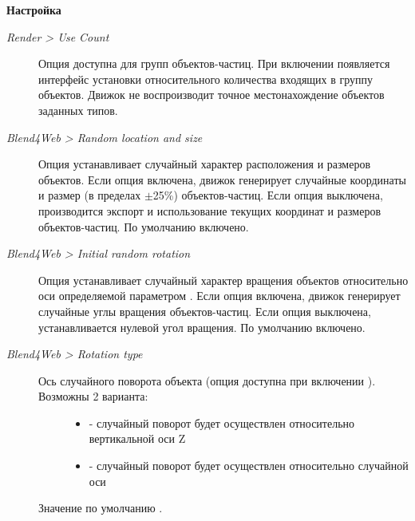 \documentclass[a4paper,12pt,oneside]{sphinxmanual}
\begin{document}
\begin{DUlineblock}{0em}
\item[] 
\end{DUlineblock}

\textbf{Настройка}
\begin{description}
\item[{\emph{Render \textgreater{} Use Count}}] \leavevmode
Опция доступна для групп объектов-частиц. При включении появляется интерфейс установки относительного количества входящих в группу объектов. Движок не воспроизводит точное местонахождение объектов заданных типов.

\item[{\emph{Blend4Web \textgreater{} Random location and size}}] \leavevmode
Опция устанавливает случайный характер расположения и размеров объектов. Если опция включена, движок генерирует случайные координаты и размер (в пределах \(\pm\)25\%) объектов-частиц. Если опция выключена, производится экспорт и использование текущих координат и размеров объектов-частиц. По умолчанию включено.

\item[{\emph{Blend4Web \textgreater{} Initial random rotation}}] \leavevmode
Опция устанавливает случайный характер вращения объектов относительно оси определяемой параметром . Если опция включена, движок генерирует случайные углы вращения объектов-частиц. Если опция выключена, устанавливается нулевой угол вращения. По умолчанию включено.

\item[{\emph{Blend4Web \textgreater{} Rotation type}}] \leavevmode\begin{description}
\item[{Ось случайного поворота объекта (опция доступна при включении ). Возможны 2 варианта:}] \leavevmode\begin{itemize}
\item {} 
 - случайный поворот будет осуществлен относительно вертикальной оси Z

\item {} 
 - случайный поворот будет осуществлен относительно случайной оси

\end{itemize}

\end{description}

Значение по умолчанию .


\end{description}
\end{document}
